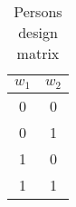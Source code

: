 \begin{table}[htbp]
\caption{\label{tab:W} Persons design matrix}\centering\medskip
\begin{tabular}{cc} \hline \hline
$w_1$  & $w_2$  \\  \hline 
0 & 0 \\  
0 & 1 \\  
1 & 0 \\  
1 & 1 \\  
\hline \hline \end{tabular}
\end{table}
